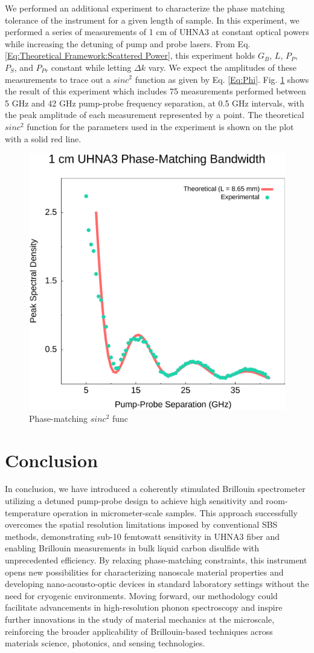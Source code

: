\documentclass[%
  reprint,
  superscriptaddress,
  amsmath,amssymb,
  aps,
  prapplied,
]{revtex4-2}
\begin{document}
We performed an additional experiment to characterize the phase matching tolerance of the instrument for a given length of sample. In this experiment, we performed a series of measurements of 1 cm of UHNA3 at constant optical powers while increasing the detuning of pump and probe lasers. From Eq. \ref{Eq:Theoretical Framework:Scattered Power}, this experiment holds $G_{B}$, $L$, $P_{P}$, $P_{S}$, and $P_{Pr}$ constant while letting $\Delta k$ vary. We expect the amplitudes of these measurements to trace out a $sinc^{2}$ function as given by Eq. \ref{Eq:Phi}. Fig. \ref{fig:Phase-Match} shows the result of this experiment which includes 75 measurements performed between 5 GHz and 42 GHz pump-probe frequency separation, at 0.5 GHz intervals, with the peak amplitude of each measurement represented by a point. The theoretical $sinc^{2}$ function for the parameters used in the experiment is shown on the plot with a solid red line.

\begin{figure}[t]
\centering
\includegraphics[width=.45\textwidth]{Phase-Match.pdf}
\caption{Phase-matching $sinc^{2}$ func}
\label{fig:Phase-Match}
\end{figure}


\section{Conclusion}
\label{Conclusion}

In conclusion, we have introduced a coherently stimulated Brillouin spectrometer utilizing a detuned pump-probe design to achieve high sensitivity and room-temperature operation in micrometer-scale samples. This approach successfully overcomes the spatial resolution limitations imposed by conventional SBS methods, demonstrating sub-10 femtowatt sensitivity in UHNA3 fiber and enabling Brillouin measurements in bulk liquid carbon disulfide with unprecedented efficiency. By relaxing phase-matching constraints, this instrument opens new possibilities for characterizing nanoscale material properties and developing nano-acousto-optic devices in standard laboratory settings without the need for cryogenic environments. Moving forward, our methodology could facilitate advancements in high-resolution phonon spectroscopy and inspire further innovations in the study of material mechanics at the microscale, reinforcing the broader applicability of Brillouin-based techniques across materials science, photonics, and sensing technologies.
\end{document}
